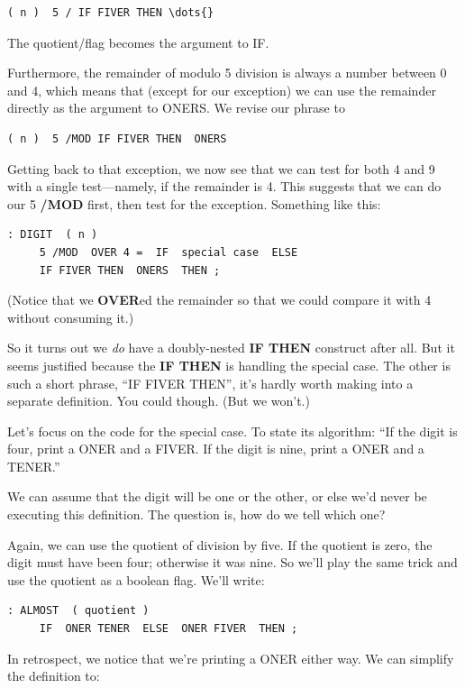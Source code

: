 \begin{verbatim}
( n )  5 / IF FIVER THEN \dots{}
\end{verbatim}
The quotient/flag becomes the argument to IF.

Furthermore, the remainder of modulo 5 division is always a
number between 0 and 4, which means that (except for our exception) we
can use the remainder directly as the argument to ONERS. We revise our
phrase to

\begin{verbatim}
( n )  5 /MOD IF FIVER THEN  ONERS
\end{verbatim}
Getting back to that exception, we now see that we can test for both 4
and 9 with a single test---namely, if the remainder is 4. This suggests that
we can do our 5 \textbf{/MOD} first, then test for the exception. Something like
this:

\begin{verbatim}
: DIGIT  ( n )
     5 /MOD  OVER 4 =  IF  special case  ELSE
     IF FIVER THEN  ONERS  THEN ;
\end{verbatim}
(Notice that we \textbf{OVER}ed the remainder so that we could compare it with
4 without consuming it.)

So it turns out we \emph{do} have a doubly-nested \textbf{IF THEN} construct
after all. But it seems justified because the \textbf{IF THEN} is handling the
special case. The other is such a short phrase, ``IF FIVER THEN'', it's
hardly worth making into a separate definition. You could though. (But we
won't.)

Let's focus on the code for the special case. To state its algorithm:
``If the digit is four, print a ONER and a FIVER. If the digit is nine, print
a ONER and a TENER.''

We can assume that the digit will be one or the other, or else we'd
never be executing this definition. The question is, how do we tell which
one?

Again, we can use the quotient of division by five. If the quotient is
zero, the digit must have been four; otherwise it was nine. So we'll play
the same trick and use the quotient as a boolean flag. We'll write:

\begin{verbatim}
: ALMOST  ( quotient )
     IF  ONER TENER  ELSE  ONER FIVER  THEN ;
\end{verbatim}
In retrospect, we notice that we're printing a ONER either way. We can
simplify the definition to:

